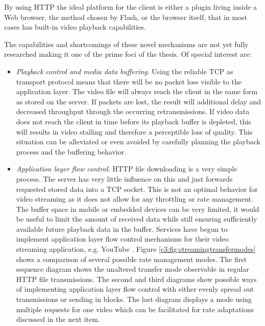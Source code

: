 By using HTTP the ideal platform for the client is either a plugin living inside a Web browser, the method chosen by Flash, or the browser itself, that in most cases has built-in video playback capabilities.

The capabilities and shortcomings of these novel mechanisms are not yet fully researched making it one of the prime foci of the thesis. Of special interest are:
 
\begin{itemize}

\item \textit{Playback control and media data buffering}. Using the reliable TCP as transport protocol means that there will be no packet loss visible to the application layer. The video file will always reach the client in the same form as stored on the server. If packets are lost, the result will additional delay and decreased throughput through the occurring retransmissions. If video data does not reach the client in time before its playback buffer is depleted, this will results in video stalling and therefore a perceptible loss of quality. This situation can be alleviated or even avoided by carefully planning the playback process and the buffering behavior.

\item \textit{Application layer flow control}. HTTP file downloading is a very simple process. The server has very little influence on this and just forwards requested stored data into a TCP socket. This is not an optimal behavior for video streaming as it does not allow for any throttling or rate management. The buffer space in mobile or embedded devices can be very limited, it would be useful to limit the amount of received data while still ensuring sufficiently available future playback data in the buffer. Services have begun to implement application layer flow control mechanisms for their video streaming application, e.g. YouTube \cite{alcock2011application}. Figure \ref{c3:fig:streamingtransfermodes} shows a comparison of several possible rate management modes. The first sequence diagram shows the unaltered transfer mode observable in regular HTTP file transmissions. The second and third diagrams show possible ways of implementing application layer flow control with either evenly spread out transmissions or sending in blocks. The last diagram displays a mode using multiple requests for one video which can be facilitated for rate adaptations discussed in the next item.


\end{itemize}
